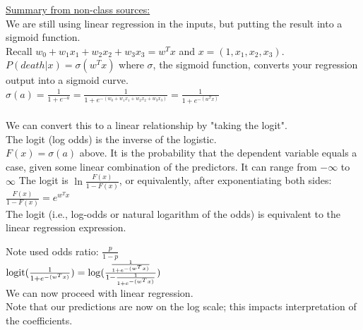 \underline{Summary from non-class sources:} \hfill \\
We are still using linear regression in the inputs, but putting the result into a sigmoid function. \hfill \\
Recall $w_0 + w_1 x_1 + w_2 x_2 + w_3 x_3 = w^Tx$ and $x = (1, x_1, x_2, x_3)$.  \hfill \\
$P(death|x) = \sigma(w^Tx)$  %
where $\sigma$, the sigmoid function,  converts your regression output into a sigmoid curve. \hfill \\
$\displaystyle \sigma(a) = \frac{1}{1+ e^{-a}} = \frac{1}{1+ e^{-(w_0 + w_1 x_1 + w_2 x_2 + w_3 x_3)}} = \frac{1}{1+ e^{-(w^Tx)}}$   \hfill \\ %
\hfill \\

We can convert this to a linear relationship by "taking the logit". \hfill \\
The logit (log odds) is the inverse of the logistic.  \hfill \\ %
$F(x) = \sigma(a)$ above.  It is the probability that the dependent variable equals a case, given some linear combination of the predictors.  It can range from $- \infty$ to $\infty$   %
The logit is $\ln \frac{F(x)}{1-F(x)}$, or equivalently, after exponentiating both sides: \hfill \\
$\frac{F(x)}{1-F(x)} = e^{w^Tx}$  \hfill \\
The logit (i.e., log-odds or natural logarithm of the odds) is equivalent to the linear regression expression.

 


Note used odds ratio: $\frac{p}{1-p}$  \hfill \\
$\textrm{logit}(\frac{1}{1+ e^{-(w^Tx)}}) = \log(\frac{\frac{1}{1+ e^{-(w^Tx)}}}{1-\frac{1}{1+ e^{-(w^Tx)}}}) $  \hfill \\ %
We can now proceed with linear regression.  \hfill \\
Note that our predictions are now on the log scale; this impacts interpretation of the coefficients.  \hfill \\  %

\hfill \\ \hfill \\   

